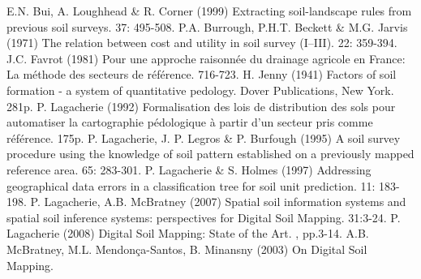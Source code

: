 \begin{footnotesize}
\begin{thebibliography}{99}
E.N. Bui, A. Loughhead \& R. Corner (1999)
\newblock Extracting soil-landscape rules from previous soil surveys.
 37: 495-508.
P.A. Burrough, P.H.T. Beckett \& M.G. Jarvis (1971)
\newblock The relation between cost and utility in soil survey (I--III).
 22: 359-394.
J.C. Favrot (1981)
\newblock Pour une approche raisonnée du drainage agricole en France: La méthode des secteurs de référence.
 716-723.
H. Jenny (1941)
\newblock Factors of soil formation - a system of quantitative pedology.
\newblock Dover Publications, New York. 281p.
P. Lagacherie (1992)
\newblock Formalisation des lois de distribution des sols pour automatiser la cartographie pédologique à partir d'un secteur pris comme référence.
 175p.
P. Lagacherie, J. P. Legros \& P. Burfough (1995)
\newblock A soil survey procedure using the knowledge of soil pattern established on a previously mapped reference area.
 65: 283-301.
P. Lagacherie \& S. Holmes (1997)
\newblock Addressing geographical data errors in a classification tree for soil unit prediction.
 11: 183-198.
P. Lagacherie, A.B. McBratney (2007)
\newblock Spatial soil information systems and spatial soil inference systems: perspectives for Digital Soil Mapping.
 31:3-24.
P. Lagacherie (2008)
\newblock Digital Soil Mapping: State of the Art.
, pp.3-14.
A.B. McBratney, M.L. Mendonça-Santos, B. Minansny (2003)
\newblock On Digital Soil Mapping.

\end{thebibliography}
\end{footnotesize}
